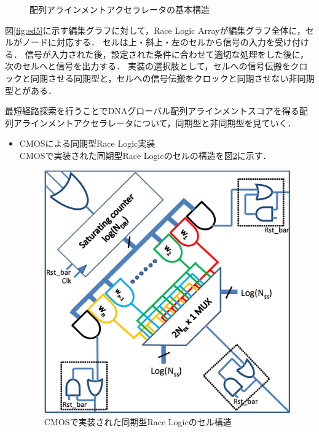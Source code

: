 \begin{figure}[t!]
\begin{center}
\caption{配列アラインメントアクセラレータの基本構造}
\label{fig:racelogicarray}
\end{center}
\end{figure}
図\ref{fig:ed5}に示す編集グラフに対して，Race Logic Arrayが編集グラフ全体に，セルがノードに対応する．
セルは上・斜上・左のセルから信号の入力を受け付ける．
信号が入力された後，設定された条件に合わせて適切な処理をした後に，
次のセルへと信号を出力する．
実装の選択肢として，セルへの信号伝搬をクロックと同期させる同期型と，セルへの信号伝搬をクロックと同期させない非同期型とがある．

最短経路探索を行うことでDNAグローバル配列アラインメントスコアを得る配列アラインメントアクセラレータについて，同期型と非同期型を見ていく．

\begin{itemize}
\item CMOSによる同期型Race Logic実装\\
CMOSで実装された同期型Race Logicのセルの構造を図\ref{fig:CMOSsync}に示す．
\begin{figure}[t!]
\begin{center}
\includegraphics[keepaspectratio,scale=0.3]{fig/2/CMOSsync.png}
\caption{CMOSで実装された同期型Race Logicのセル構造\cite{madhavan2014race}}
\label{fig:CMOSsync}
\end{center}
\end{figure}


\end{itemize}
